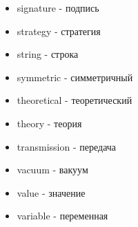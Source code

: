 \begin{multicols}{2}
\begin{itemize}
		\item signature - подпись
		
		\item strategy - стратегия
		
		\item string - строка
		
		\item symmetric - симметричный
		
		\item theoretical - теоретический
		\item theory - теория
		
		\item transmission - передача
		
		\item vacuum - вакуум
		\item value - значение
		
		\item variable - переменная
		
		
		
	\end{itemize}
\end{multicols}